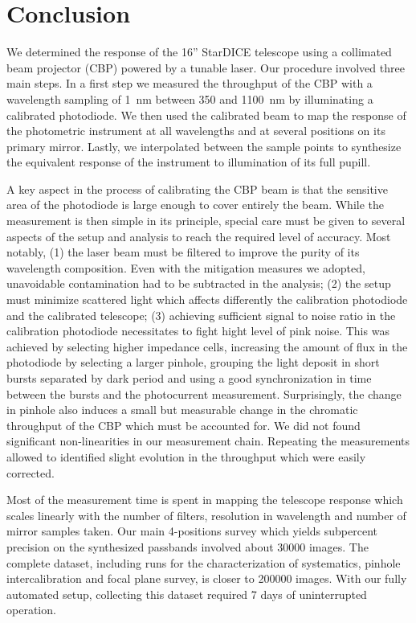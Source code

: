 \section{Conclusion}
\label{sec:discussion}

We determined the response of the 16'' StarDICE telescope using a
collimated beam projector (CBP) powered by a tunable laser. Our
procedure involved three main steps. In a first step we measured the
throughput of the CBP with a wavelength sampling of \SI{1}{nm} between
350 and \SI{1100}{nm} by illuminating a calibrated photodiode. We then
used the calibrated beam to map the response of the photometric
instrument at all wavelengths and at several positions on its primary
mirror. Lastly, we interpolated between the sample points to
synthesize the equivalent response of the instrument to illumination
of its full pupill.

A key aspect in the process of calibrating the CBP beam is that the
sensitive area of the photodiode is large enough to cover entirely the
beam. While the measurement is then simple in its principle, special
care must be given to several aspects of the setup and analysis to
reach the required level of accuracy. Most notably, (1) the laser beam
must be filtered to improve the purity of its wavelength
composition. Even with the mitigation measures we adopted, unavoidable
contamination had to be subtracted in the analysis; (2) the setup must
minimize scattered light which affects differently the calibration
photodiode and the calibrated telescope; (3) achieving sufficient
signal to noise ratio in the calibration photodiode necessitates to
fight hight level of pink noise. This was achieved by selecting higher
impedance cells, increasing the amount of flux in the photodiode by
selecting a larger pinhole, grouping the light deposit in short bursts
separated by dark period and using a good synchronization in time
between the bursts and the photocurrent measurement. Surprisingly, the
change in pinhole also induces a small but measurable change in the
chromatic throughput of the CBP which must be accounted for. We did
not found significant non-linearities in our measurement
chain. Repeating the measurements allowed to identified slight
evolution in the throughput which were easily corrected.

Most of the measurement time is spent in mapping the telescope
response which scales linearly with the number of filters,
resolution in wavelength and number of mirror samples taken. Our main
4-positions survey which yields subpercent precision on the
synthesized passbands involved about 30000 images. The complete
dataset, including runs for the characterization of systematics,
pinhole intercalibration and focal plane survey, is closer to 200000
images. With our fully automated setup, collecting this dataset required
7 days of uninterrupted operation. 

